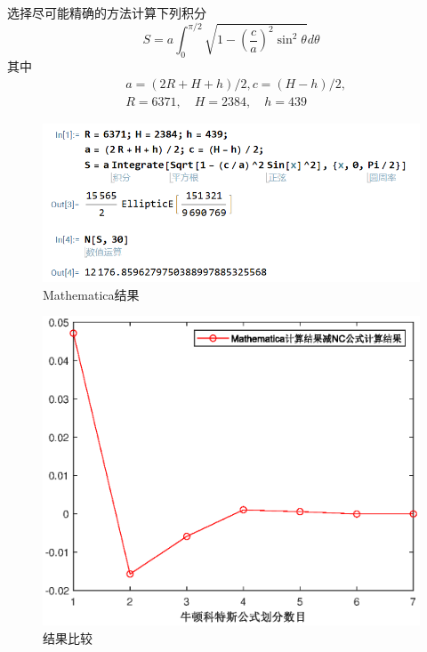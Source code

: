 \begin{ex}
	选择尽可能精确的方法计算下列积分
	$$
	S=a \int_0^{\pi / 2} \sqrt{1-\left(\frac{c}{a}\right)^2 \sin ^2 \theta} d \theta
	$$
	其中
	$$
	\begin{aligned}
		& a=(2 R+H+h) / 2, c=(H-h) / 2, \\
		& R=6371, \quad H=2384, \quad h=439
	\end{aligned}
	$$
\end{ex}
\begin{figure}[H]
	\centering
	\includegraphics[width = 0.8\linewidth]{w11/fig.png}
	\caption{Mathematica结果}
\end{figure}

\begin{figure}[H]
	\centering
	\includegraphics[width = 0.61\linewidth]{w11/fig.eps}
	\caption{结果比较}
\end{figure}

